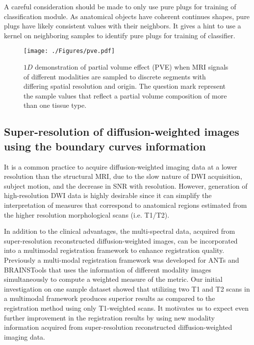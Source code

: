 \noindent A careful consideration should be made to only use pure plugs for training of classification module.
As anatomical objects have coherent continues shapes, pure plugs have likely consistent values with their neighbors. It gives a hint to use a kernel on neighboring samples to identify pure plugs for training of classifier.

\begin{figure}[ht!]
    \begin{center}
      \texttt{[image: ./Figures/pve.pdf]}
    \end{center}
    \vspace{-15pt}
    \caption{$1D$ demonstration of partial volume effect (PVE) when MRI signals of different modalities are sampled to discrete segments with differing spatial resolution and origin. The question mark represent the sample values that reflect a partial volume composition of more than one tissue type.}
    \vspace{-5pt}
    \label{fig:pve}
\end{figure}

\subsection{Super-resolution of diffusion-weighted images using the boundary curves information}
It is a common practice to acquire diffusion-weighted imaging data at a lower resolution than the structural MRI, due to the slow nature of DWI acquisition, subject motion, and the decrease in SNR with resolution. However, generation of high-resolution DWI data is highly desirable since it can simplify the interpretation of measures that correspond to anatomical regions estimated from the higher resolution morphological scans (i.e. T1/T2).
\newline

\noindent In addition to the clinical advantages, the multi-spectral data, acquired from super-resolution reconstructed diffusion-weighted images, can be incorporated into a multimodal registration framework to enhance registration quality. Previously a multi-modal registration framework was developed for ANTs \cite{Avants2008b, Avantsa} and BRAINSTools \cite{BRAINSia} that uses the information of different modality images simultaneously to compute a weighted measure of the metric. Our initial investigation on one sample dataset showed that utilizing two T1 and T2 scans in a multimodal framework produces superior results as compared to the registration method using only T1-weighted scans. It motivates us to expect even further improvement in the registration results by using new modality information acquired from super-resolution reconstructed diffusion-weighted imaging data.
\newline

